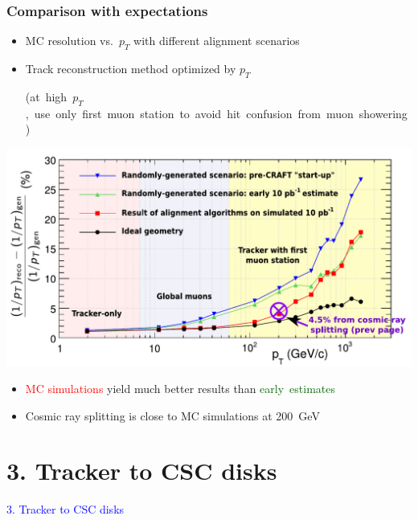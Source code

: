 \documentclass[compress]{beamer}
\begin{document}
\begin{frame}
\frametitle{Comparison with expectations}

\begin{itemize}
\item MC resolution vs.~$p_T$ with different alignment scenarios
\item Track reconstruction method optimized by $p_T$

\mbox{\scriptsize (at high $p_T$, use only first muon station to avoid hit confusion from muon showering)\hspace{-1 cm}}
\end{itemize}

\vspace{-0.15 cm}
\begin{center}
\includegraphics[width=0.9\linewidth]{curvature_resolution_cosmicpoint.pdf}
\end{center}

\vspace{-0.35 cm}
\begin{itemize}
\item \textcolor{red}{MC simulations} yield much better results than \mbox{\textcolor{darkgreen}{early estimates}\hspace{-1 cm}}
\item Cosmic ray splitting is close to MC simulations at 200~GeV
\end{itemize}
\end{frame}

\section*{3. Tracker to CSC disks}
\begin{frame}
\begin{center}
\Huge \textcolor{blue}{3. Tracker to CSC disks}
\end{center}
\end{frame}
\end{document}
